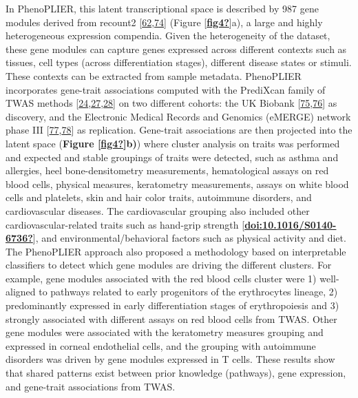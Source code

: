 In PhenoPLIER, this latent transcriptional space is described by 987 gene modules derived from recount2 {[}\protect\hyperlink{ref-14rnBunuZ}{62},\protect\hyperlink{ref-6SPTvFXq}{74}{]} (Figure {[}\protect\hyperlink{ref-fig4}{\textbf{fig4?}}{]}a), a large and highly heterogeneous expression compendia.
Given the heterogeneity of the dataset, these gene modules can capture genes expressed across different contexts such as tissues, cell types (across differentiation stages), different disease states or stimuli.
These contexts can be extracted from sample metadata.
PhenoPLIER incorporates gene-trait associations computed with the PrediXcan family of TWAS methods {[}\protect\hyperlink{ref-Z8bvDdVq}{24},\protect\hyperlink{ref-vLyTudUB}{27},\protect\hyperlink{ref-1FFzCXo1s}{28}{]} on two different cohorts: the UK Biobank {[}\protect\hyperlink{ref-nmJxPpE5}{75},\protect\hyperlink{ref-lY5ln3dB}{76}{]} as discovery, and the Electronic Medical Records and Genomics (eMERGE) network phase III {[}\protect\hyperlink{ref-wfqjCerX}{77},\protect\hyperlink{ref-gZAOkumx}{78}{]} as replication.
Gene-trait associations are then projected into the latent space (\textbf{Figure {[}\protect\hyperlink{ref-fig4}{\textbf{fig4?}}{]}b)}) where cluster analysis on traits was performed and expected and stable groupings of traits were detected, such as asthma and allergies, heel bone-densitometry measurements, hematological assays on red blood cells, physical measures, keratometry measurements, assays on white blood cells and platelets, skin and hair color traits, autoimmune disorders, and cardiovascular diseases.
The cardiovascular grouping also included other cardiovascular-related traits such as hand-grip strength {[}\protect\hyperlink{ref-doi:10.1016ux2fS0140-6736}{\textbf{doi:10.1016/S0140-6736?}}{]}, and environmental/behavioral factors such as physical activity and diet.
The PhenoPLIER approach also proposed a methodology based on interpretable classifiers to detect which gene modules are driving the different clusters.
For example, gene modules associated with the red blood cells cluster were 1) well-aligned to pathways related to early progenitors of the erythrocytes lineage, 2) predominantly expressed in early differentiation stages of erythropoiesis and 3) strongly associated with different assays on red blood cells from TWAS.
Other gene modules were associated with the keratometry measures grouping and expressed in corneal endothelial cells, and the grouping with autoimmune disorders was driven by gene modules expressed in T cells.
These results show that shared patterns exist between prior knowledge (pathways), gene expression, and gene-trait associations from TWAS.

